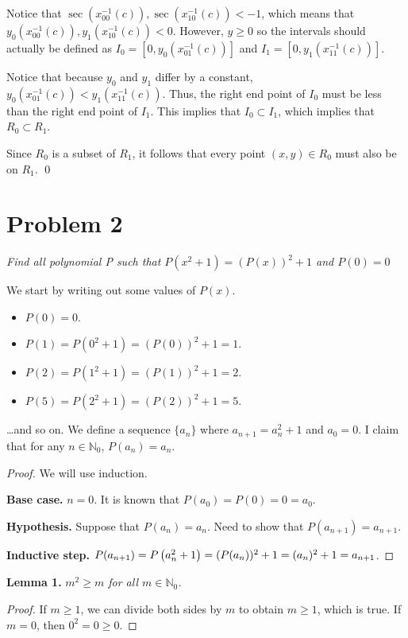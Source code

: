 \documentclass{article}
\newcommand*{\paren}[1]{\ensuremath\left(#1\right)}
\newcommand*{\problem}[1]{\section*{Problem #1}}
\begin{document}
Notice that $\sec(x_{00}^{-1}(c)),\sec(x_{10}^{-1}(c))<-1$, which means that $y_0(x_{00}^{-1}(c)),y_1(x_{10}^{-1}(c))<0$. However, $y\geq0$ so the intervals should actually be defined as $I_0=[0,y_0(x_{01}^{-1}(c))]$ and $I_1=[0,y_1(x_{11}^{-1}(c))]$.

Notice that because $y_0$ and $y_1$ differ by a constant, $y_0(x_{01}^{-1}(c))<y_1(x_{11}^{-1}(c))$. Thus, the right end point of $I_0$ must be less than the right end point of $I_1$. This implies that $I_0\subset I_1$, which implies that $R_0\subset R_1$.

Since $R_0$ is a subset of $R_1$, it follows that every point $(x,y)\in R_0$ must also be on $R_1$. \qed

\problem{2}

\begin{mdframed}
	\textit{Find all polynomial P such that $P(x^2+1)=(P(x))^2+1$ and $P(0)=0$}
\end{mdframed}

We start by writing out some values of $P(x)$.
\begin{itemize}
	\item $P(0)=0$.
	\item $P(1)=P(0^2+1)=(P(0))^2+1=1$.
	\item $P(2)=P(1^2+1)=(P(1))^2+1=2$.
	\item $P(5)=P(2^2+1)=(P(2))^2+1=5$.
\end{itemize}
\ldots and so on. We define a sequence $\{a_n\}$ where $a_{n+1}=a_n^2+1$ and $a_0=0$. I claim that for any $n\in\mathbb{N}_0$, $P(a_n)=a_n$.

\begin{proof}
	We will use induction.

	\textbf{Base case.} $n=0$. It is known that $P(a_0)=P(0)=0=a_0$.

	\textbf{Hypothesis.} Suppose that $P(a_n)=a_n$. Need to show that $P(a_{n+1})=a_{n+1}$.
	
	\textbf{Inductive step.}
	$P(a_{n+1})=P\paren{a_n^2+1}=(P(a_n))^2+1=(a_n)^2+1=a_{n+1}$.
\end{proof}

\begin{mdframed}
	\textbf{Lemma 1.} \textit{$m^2\geq m$ for all $m\in\mathbb{N}_0$.}
	\begin{proof}
		If $m\geq1$, we can divide both sides by $m$ to obtain $m\geq1$, which is true. If $m=0$, then $0^2=0\geq0$. 
	\end{proof}
\end{mdframed}
\end{document}
